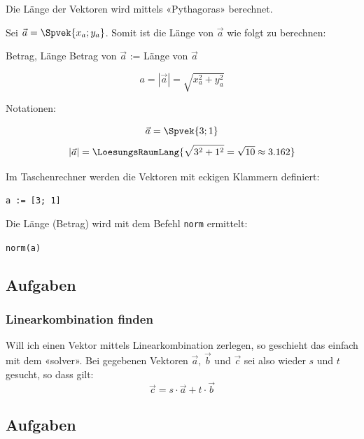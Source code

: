 Die Länge der Vektoren wird mittels «Pythagoras» berechnet.

Sei $\vec{a}  = \Spvek{x_a;y_a}$. Somit ist die Länge von
    $\vec{a}$ wie folgt zu berechnen:

    \begin{gesetz}{Betrag, Länge}{}
      Betrag von $\vec{a}$ := Länge von $\vec{a}$

      $$a = |\vec{a}| = \sqrt{x_a^2 + y_a^2}$$
      \end{gesetz}
    Notationen:

    \begin{beispiel}{}{}
      $$ \vec{a}= \Spvek{3;1}$$
        $$|\vec{a}| = \LoesungsRaumLang{\sqrt{3^2+1^2} = \sqrt{10}\approx 3.162}$$
      \end{beispiel}
    

    \begin{bemerkung}{}{}
      Im Taschenrechner werden die Vektoren mit eckigen Klammern
      definiert:

      \texttt{a := [3; 1]}

      Die Länge (Betrag) wird mit dem Befehl \texttt{norm} ermittelt:

      \texttt{norm(a)}
    \end{bemerkung}
    \subsection*{Aufgaben}
\newpage

\newpage

\subsubsection{Linearkombination finden}
Will ich einen Vektor mittels Linearkombination
 zerlegen, so geschieht das einfach mit dem
«solver». Bei gegebenen Vektoren $\vec{a}$, $\vec{b}$ und $\vec{c}$ sei also
wieder $s$ und $t$ gesucht, so dass gilt:
$$\vec{c} = s\cdot{}\vec{a} + t\cdot{}\vec{b}$$


\subsection*{Aufgaben}

\newpage


